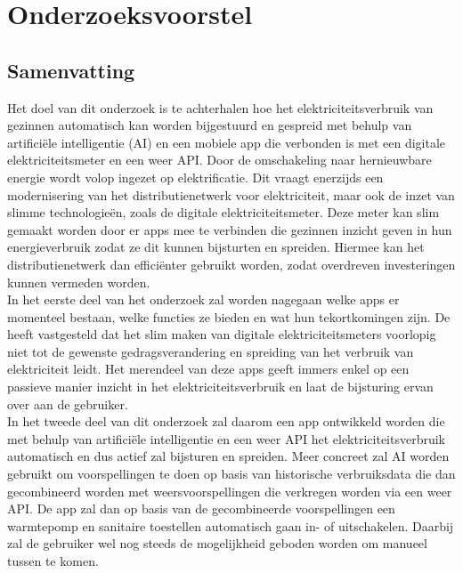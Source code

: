 \documentclass[dutch,dit,thesis]{hogentreport}
\begin{document}






%
%


\appendix

\chapter{Onderzoeksvoorstel}

\section*{Samenvatting}

Het doel van dit onderzoek is te achterhalen hoe het elektriciteitsverbruik van gezinnen automatisch kan worden bijgestuurd en gespreid met behulp van artificiële intelligentie (AI) en een mobiele app die verbonden is met een digitale elektriciteitsmeter en een weer API. Door de omschakeling naar hernieuwbare energie wordt volop ingezet op elektrificatie. Dit vraagt enerzijds een modernisering van het distributienetwerk voor elektriciteit, maar  ook de inzet van slimme technologieën, zoals de digitale elektriciteitsmeter. Deze meter kan slim gemaakt worden door er apps mee te verbinden die gezinnen inzicht geven in hun energieverbruik zodat ze dit kunnen bijsturten en spreiden. Hiermee kan het distributienetwerk dan efficiënter gebruikt worden, zodat overdreven investeringen kunnen vermeden worden. \\

In het eerste deel van het onderzoek zal worden nagegaan welke apps er momenteel bestaan, welke functies ze bieden en wat hun tekortkomingen zijn. De \textcite{VREG2021} heeft vastgesteld dat het slim maken van digitale elektriciteitsmeters voorlopig niet tot de gewenste gedragsverandering en spreiding van het verbruik van elektriciteit leidt. Het merendeel van deze apps geeft immers enkel op een passieve manier inzicht in het elektriciteitsverbruik en laat de bijsturing ervan over aan de gebruiker. \\

In het tweede deel van dit onderzoek zal daarom een app ontwikkeld worden die met behulp van artificiële intelligentie en een weer API het elektriciteitsverbruik automatisch en dus actief zal bijsturen en spreiden. Meer concreet zal AI worden gebruikt om voorspellingen te doen op basis van historische verbruiksdata die dan gecombineerd worden met weersvoorspellingen die verkregen worden via een weer API. De app zal dan op basis van de gecombineerde voorspellingen een warmtepomp en sanitaire toestellen automatisch gaan in- of uitschakelen. Daarbij zal de gebruiker wel nog steeds de mogelijkheid geboden worden om manueel tussen te komen. \\
\end{document}
